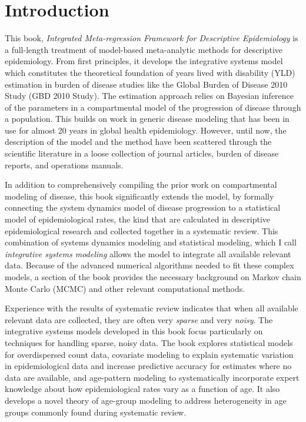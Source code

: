 \section{Introduction}
This book, \emph{Integrated Meta-regression Framework for Descriptive
  Epidemiology} is a full-length treatment of model-based
meta-analytic methods for descriptive epidemiology.  From
first principles, it develops the integrative systems model which constitutes the
theoretical foundation of years lived with disability (YLD) estimation
in burden of disease studies like the Global Burden of Disease 2010
Study (GBD 2010 Study).  The estimation approach relies on Bayesian
inference of the parameters in a compartmental model of the
progression of disease through a population.  This builds on work in
generic disease modeling that has been in use for almost 20 years
in global health epidemiology. \cite{Barendregt_Generic_2003}
However, until now, the description of the model and the method have
been scattered through the scientific literature in a loose collection
of journal articles, burden of disease reports, and operations
manuals.

In addition to comprehensively compiling the prior work on compartmental modeling of
disease, this book significantly extends the
model, by formally connecting the system dynamics model of disease
progression to a statistical model of epidemiological rates, the kind
that are calculated in descriptive epidemiological research and
collected together in a systematic review.  This combination of
systems dynamics modeling and statistical modeling, which I call
\emph{integrative systems modeling} allows the model to integrate all
available relevant data.  Because of the advanced numerical algorithms needed to fit these complex models, a section of the book provides the
necessary background on Markov chain Monte Carlo (MCMC) and other
relevant computational methods.

Experience with the results of systematic review indicates that when
all available relevant data are collected, they are often very
\emph{sparse} and very \emph{noisy}.  The integrative systems models
developed in this book focus particularly on techniques for handling
sparse, noisy data.  The book explores statistical models for
overdispersed count data, covariate modeling to explain
systematic variation in epidemiological data and increase
predictive accuracy for estimates where no data are
available, and age-pattern modeling to systematically incorporate
expert knowledge about how epidemiological rates vary as a function of
age.  It also develops a novel theory of age-group modeling to address
heterogeneity in age groups commonly found during systematic review.


